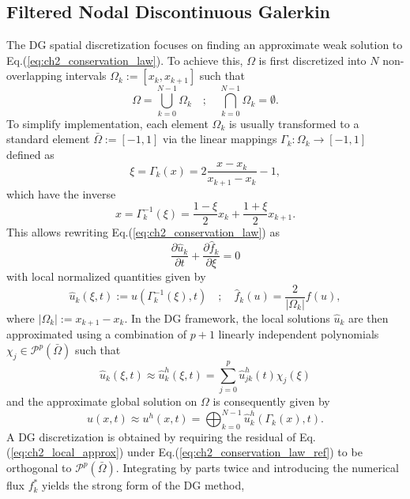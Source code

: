 \documentclass[preprint,12pt]{elsarticle}
\begin{document}
\subsection{Filtered Nodal Discontinuous Galerkin}
The DG spatial discretization focuses on finding an approximate weak solution to Eq.(\ref{eq:ch2_conservation_law}). To achieve this, $\Omega$ is first discretized into $N$ non-overlapping intervals $\Omega_k := [x_k,x_{k+1}]$ such that
\begin{equation}
    \Omega = \bigcup_{k=0}^{N-1} \Omega_k
    \quad ; \quad
    \bigcap_{k=0}^{N-1} \Omega_k = \emptyset.
    \label{eq:ch2_discretization}
\end{equation}
To simplify implementation, each element $\Omega_k$ is usually transformed to a standard element $\bar{\Omega} := [-1,1]$ via the linear mappings $\Gamma_k : \Omega_k \to [-1, 1]$ defined as
\begin{equation}
    \xi = \Gamma_k(x) = 2\frac{x-x_k}{x_{k+1}-x_k} -1,
\end{equation}
which have the inverse
\begin{equation}
    x=\Gamma^{-1}_k(\xi) = \frac{1-\xi}{2}x_k + \frac{1+\xi}{2}x_{k+1}.
\end{equation}
This allows rewriting Eq.(\ref{eq:ch2_conservation_law}) as
\begin{equation}
    \frac{\partial \hat{u}_k}{\partial t} + \frac{\partial \hat{f}_k}{\partial \xi} = 0
    \label{eq:ch2_conservation_law_ref}
\end{equation}
with local normalized quantities given by
\begin{equation}
    \hat{u}_k(\xi,t) := u(\Gamma_k^{-1}(\xi), t)
    \quad ; \quad
    \hat{f}_k(u) = \frac{2}{|\Omega_k|}f(u),
\end{equation}
where $|\Omega_k|:= x_{k+1} - x_k$. In the DG framework, the local solutions $\hat{u}_k$ are then approximated using a combination of $p+1$ linearly independent polynomials $\chi_j \in \mathcal{P}^{p}(\bar{\Omega})$ such that
\begin{equation}
    \hat{u}_k(\xi,t) \approx \hat{u}_k^h(\xi,t) = \sum_{j=0}^{p} \hat{u}^h_{jk}(t) \chi_j(\xi) \label{eq:ch2_local_approx}
\end{equation}
and the approximate global solution on $\Omega$ is consequently given by
\begin{equation}
    u(x,t) \approx u^h(x,t) = \bigoplus_{k=0}^{N-1} \hat{u}_k^h(\Gamma_k(x),t).
\end{equation}
A DG discretization is obtained by requiring the residual of Eq.(\ref{eq:ch2_local_approx}) under Eq.(\ref{eq:ch2_conservation_law_ref}) to be orthogonal to $\mathcal{P}^{p}(\bar{\Omega})$. Integrating by parts twice and introducing the numerical flux $f^{*}_k$ yields the strong form of the DG method,
\end{document}
